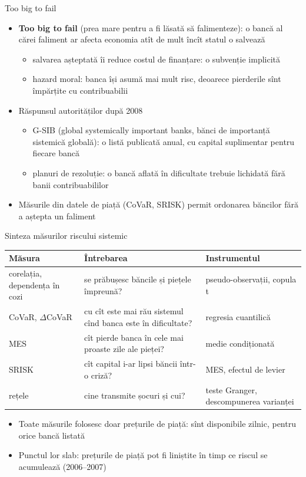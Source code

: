 \begin{frame}{Too big to fail}
\itemsize{\small}
\begin{itemize}
    \item \textbf{Too big to fail} (prea mare pentru a fi lăsată să falimenteze): o bancă al cărei faliment ar afecta economia atît de mult încît statul o salvează
    \begin{itemize}
        \item salvarea așteptată îi reduce costul de finanțare: o subvenție implicită
        \item hazard moral: banca își asumă mai mult risc, deoarece pierderile sînt împărțite cu contribuabilii
    \end{itemize}
    \item Răspunsul autorităților după 2008 
    \begin{itemize}
        \item G-SIB (global systemically important banks, bănci de importanță sistemică globală): o listă publicată anual, cu capital suplimentar pentru fiecare bancă
        \item planuri de rezoluție: o bancă aflată în dificultate trebuie lichidată fără banii contribuabililor
    \end{itemize}
    \item Măsurile din datele de piață (CoVaR, SRISK) permit ordonarea băncilor fără a aștepta un faliment
\end{itemize}
\end{frame}

\begin{frame}{Sinteza măsurilor riscului sistemic}
\itemsize{\small}
\begin{center}
\footnotesize
\begin{tabular}{>{\raggedright\arraybackslash}p{2.4cm}>{\raggedright\arraybackslash}p{5.6cm}>{\raggedright\arraybackslash}p{3.4cm}}
\toprule
\textbf{Măsura} & \textbf{Întrebarea} & \textbf{Instrumentul} \\
\midrule
corelația, dependența în cozi & se prăbușesc băncile și piețele împreună? & pseudo-observații, copula t \\
CoVaR, $\Delta$CoVaR & cu cît este mai rău sistemul cînd banca este în dificultate? & regresia cuantilică \\
MES & cît pierde banca în cele mai proaste zile ale pieței? & medie condiționată \\
SRISK & cît capital i-ar lipsi băncii într-o criză? & MES, efectul de levier \\
rețele & cine transmite șocuri și cui? & teste Granger, descompunerea varianței \\
\bottomrule
\end{tabular}
\end{center}
\begin{itemize}
    \item Toate măsurile folosesc doar prețurile de piață: sînt disponibile zilnic, pentru orice bancă listată
    \item Punctul lor slab: prețurile de piață pot fi liniștite în timp ce riscul se acumulează (2006--2007)
\end{itemize}
\end{frame}


